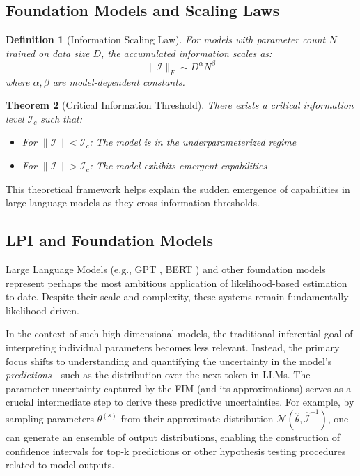 \documentclass[11pt]{article}
\newtheorem{theorem}{Theorem}
\newtheorem{definition}[theorem]{Definition}
\begin{document}
\subsection{Foundation Models and Scaling Laws}

\begin{definition}[Information Scaling Law]
For models with parameter count $N$ trained on data size $D$, the accumulated information scales as:
\begin{equation}
\|\mathcal{I}\|_F \sim D^\alpha N^\beta
\end{equation}
where $\alpha, \beta$ are model-dependent constants.
\end{definition}

\begin{theorem}[Critical Information Threshold]
\label{thm:critical_info}
There exists a critical information level $\mathcal{I}_c$ such that:
\begin{itemize}
\item For $\|\mathcal{I}\| < \mathcal{I}_c$: The model is in the underparameterized regime
\item For $\|\mathcal{I}\| > \mathcal{I}_c$: The model exhibits emergent capabilities
\end{itemize}
\end{theorem}

This theoretical framework helps explain the sudden emergence of capabilities in large language models as they cross information thresholds.

\subsection{LPI and Foundation Models}
Large Language Models (e.g., GPT \cite{radford2018improving}, BERT \cite{devlin2018bert}) and other foundation models represent perhaps the most ambitious application of likelihood-based estimation to date. Despite their scale and complexity, these systems remain fundamentally likelihood-driven.

In the context of such high-dimensional models, the traditional inferential goal of interpreting individual parameters becomes less relevant. Instead, the primary focus shifts to understanding and quantifying the uncertainty in the model's \textit{predictions}---such as the distribution over the next token in LLMs. The parameter uncertainty captured by the FIM (and its approximations) serves as a crucial intermediate step to derive these predictive uncertainties. For example, by sampling parameters $\theta^{(s)}$ from their approximate distribution $\mathcal{N}(\hat{\theta}, \hat{\mathcal{I}}^{-1})$, one can generate an ensemble of output distributions, enabling the construction of confidence intervals for top-k predictions or other hypothesis testing procedures related to model outputs.
\end{document}
